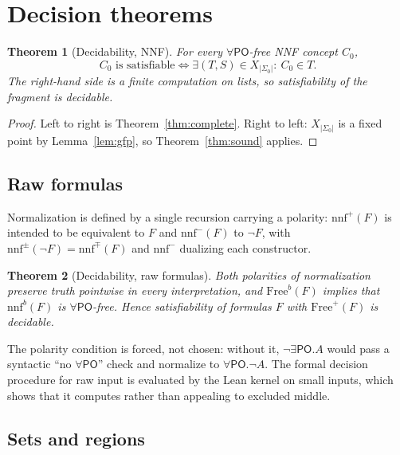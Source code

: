 \documentclass[11pt]{article}
\newcommand{\PO}{\mathsf{PO}}
\theoremstyle{plain}
\newtheorem{theorem}{Theorem}[section]
\theoremstyle{definition}
\begin{document}
\section{Decision theorems}
\label{sec:main}

\begin{theorem}[Decidability, NNF]\label{thm:main}
For every $\forall\PO$-free NNF concept $C_0$,
\[
  C_0 \text{ is satisfiable} \iff \exists (T,S)\in X_{|\Sigma_0|}:\ C_0\in T .
\]
The right-hand side is a finite computation on lists, so satisfiability of the
fragment is decidable.
\end{theorem}

\begin{proof}
Left to right is Theorem~\ref{thm:complete}. Right to left: $X_{|\Sigma_0|}$ is a
fixed point by Lemma~\ref{lem:gfp}, so Theorem~\ref{thm:sound} applies.
\end{proof}

\subsection{Raw formulas}

Normalization is defined by a single recursion carrying a polarity:
$\mathrm{nnf}^{+}(F)$ is intended to be equivalent to $F$ and
$\mathrm{nnf}^{-}(F)$ to $\neg F$, with $\mathrm{nnf}^{\pm}(\neg F)=
\mathrm{nnf}^{\mp}(F)$ and $\mathrm{nnf}^{-}$ dualizing each constructor.

\begin{theorem}[Decidability, raw formulas]\label{thm:raw}
Both polarities of normalization preserve truth pointwise in every
interpretation, and $\mathrm{Free}^{b}(F)$ implies that $\mathrm{nnf}^{b}(F)$ is
$\forall\PO$-free. Hence satisfiability of formulas $F$ with $\mathrm{Free}^{+}(F)$
is decidable.
\end{theorem}

The polarity condition is forced, not chosen: without it, $\neg\exists\PO.A$
would pass a syntactic ``no $\forall\PO$'' check and normalize to
$\forall\PO.\neg A$. The formal decision procedure for raw input is evaluated by
the Lean kernel on small inputs, which shows that it computes rather than
appealing to excluded middle.

\subsection{Sets and regions}
\end{document}
